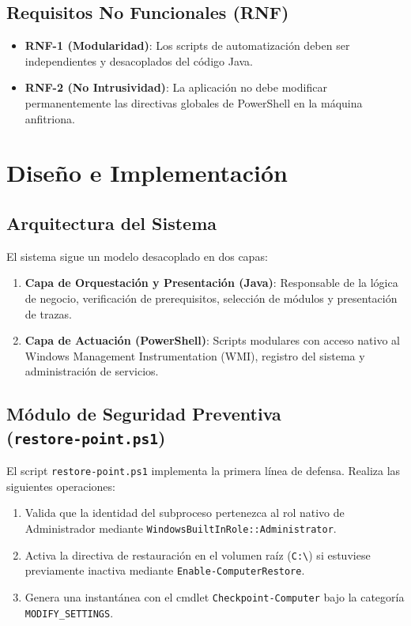 \documentclass[12pt,a4paper]{report}
\begin{document}
\section{Requisitos No Funcionales (RNF)}
\begin{itemize}
    \item \textbf{RNF-1 (Modularidad)}: Los scripts de automatización deben ser independientes y desacoplados del código Java.
    \item \textbf{RNF-2 (No Intrusividad)}: La aplicación no debe modificar permanentemente las directivas globales de PowerShell en la máquina anfitriona.
\end{itemize}

\chapter{Diseño e Implementación}
\section{Arquitectura del Sistema}
El sistema sigue un modelo desacoplado en dos capas:
\begin{enumerate}
    \item \textbf{Capa de Orquestación y Presentación (Java)}: Responsable de la lógica de negocio, verificación de prerequisitos, selección de módulos y presentación de trazas.
    \item \textbf{Capa de Actuación (PowerShell)}: Scripts modulares con acceso nativo al Windows Management Instrumentation (WMI), registro del sistema y administración de servicios.
\end{enumerate}

\section[Módulo de Seguridad Preventiva]{Módulo de Seguridad Preventiva\\ \large(\texttt{restore-point.ps1})}
El script \texttt{restore-point.ps1} implementa la primera línea de defensa. Realiza las siguientes operaciones:
\begin{enumerate}
    \item Valida que la identidad del subproceso pertenezca al rol nativo de Administrador mediante \texttt{WindowsBuiltInRole::\allowbreak Administrator}.
    \item Activa la directiva de restauración en el volumen raíz (\texttt{C:\textbackslash}) si estuviese previamente inactiva mediante \texttt{Enable-ComputerRestore}.
    \item Genera una instantánea con el cmdlet \texttt{Checkpoint-Computer} bajo la categoría \texttt{MODIFY\_SETTINGS}.
\end{enumerate}
\end{document}
